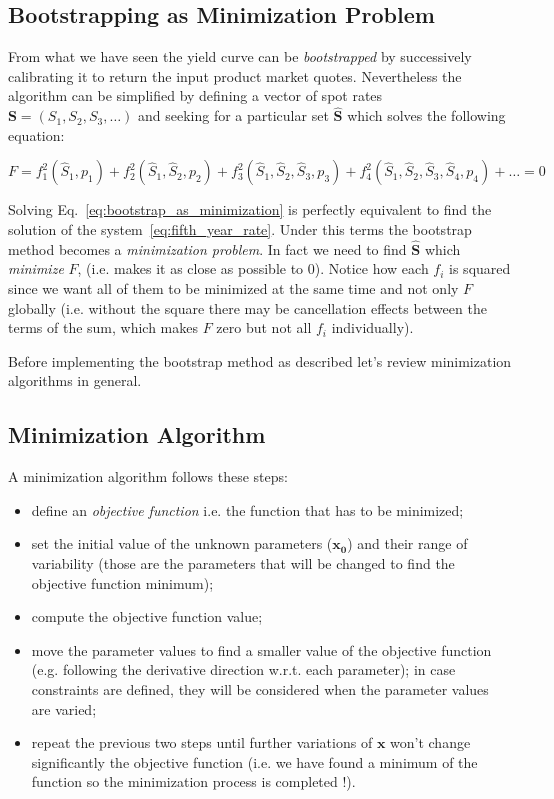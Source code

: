 \subsection{Bootstrapping as Minimization Problem}
\label{sec:bootstrap_as_minimization}

From what we have seen the yield curve can be \emph{bootstrapped} by successively calibrating it to return the input product market quotes.
Nevertheless the algorithm can be simplified by defining a vector of spot rates $\mathbf{S} = (S_1, S_2, S_3, \ldots)$ and seeking for a particular set $\mathbf{\hat{S}}$ which solves the following equation:

\begin{equation}
F = f_1^2(\hat{S}_1,p_1) + f_2^2(\hat{S}_1, \hat{S}_2,p_2) + f_3^2(\hat{S}_1, \hat{S}_2, \hat{S}_3,p_3) + f_4^2(\hat{S}_1, \hat{S}_2, \hat{S}_3, \hat{S}_4,p_4) + \ldots = 0
\label{eq:bootstrap_as_minimization}
\end{equation}

Solving Eq.~\ref{eq:bootstrap_as_minimization} is perfectly equivalent to find the solution of the system~\ref{eq:fifth_year_rate}.
Under this terms the bootstrap method becomes a \emph{minimization problem}. In fact we need to find $\mathbf{\hat{S}}$ which \emph{minimize} $F$, (i.e. makes it as close as possible to 0).
Notice how each $f_i$ is squared since we want all of them to be minimized at the same time and not only $F$ globally (i.e. without the square there may be cancellation effects between the terms of the sum, which makes $F$ zero but not all $f_i$ individually).

Before implementing the bootstrap method as described let's review minimization algorithms in general.

\subsection{Minimization Algorithm}
\label{minimization-algorithm}

A minimization algorithm follows these steps:

\begin{itemize}
\tightlist
\item
  define an \emph{objective function} i.e. the function that has to be minimized;
\item
  set the initial value of the unknown parameters ($\mathbf{x_0}$) and their range of variability (those are the parameters that will be changed to find the objective function minimum);
\item
  compute the objective function value;
\item
  move the parameter values to find a smaller value of the objective function (e.g. following the derivative direction w.r.t. each parameter); in case constraints are defined, they will be considered when the parameter values are varied;
\item
  repeat the previous two steps until further variations of $\mathbf{x}$ won't change significantly the objective
  function (i.e. we have found a minimum of the function so the minimization process is completed !).
\end{itemize}

